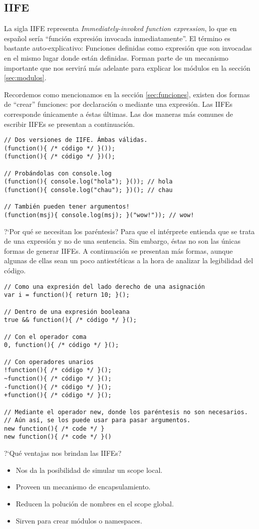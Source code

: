 
\subsection{IIFE}
\label{sec:iife}

La sigla IIFE representa \textit{Immediately-invoked function expression}, lo que en español sería "`función expresión invocada inmediatamente"'. El término es bastante auto-explicativo: Funciones definidas como expresión que son invocadas en el mismo lugar donde están definidas. Forman parte de un mecanismo importante que nos servirá más adelante para explicar los módulos en la sección \ref{sec:modulos}.

Recordemos como mencionamos en la sección \ref{sec:funciones}, existen dos formas de "`crear"' funciones: por declaración o mediante una expresión. Las IIFEs corresponde únicamente a éstas últimas. Las dos maneras más comunes de escribir IIFEs se presentan a continuación.

\begin{lstlisting}[title={Introduciendo las IIFEs}]
// Dos versiones de IIFE. Ámbas válidas.
(function(){ /* código */ }()); 
(function(){ /* código */ })(); 

// Probándolas con console.log
(function(){ console.log("hola"); }()); // hola
(function(){ console.log("chau"); })(); // chau

// También pueden tener argumentos!
(function(msj){ console.log(msj); }("wow!")); // wow!
\end{lstlisting}

?`Por qué se necesitan los paréntesis? Para que el intérprete entienda que se trata de una expresión y no de una sentencia. Sin embargo, éstas no son las únicas formas de generar IIFEs. A continuación se presentan más formas, aunque algunas de ellas sean un poco antiestéticas a la hora de analizar la legibilidad del código.

\begin{lstlisting}[title={Otras formas de escribir IIFEs}]
// Como una expresión del lado derecho de una asignación
var i = function(){ return 10; }();

// Dentro de una expresión booleana
true && function(){ /* código */ }();

// Con el operador coma
0, function(){ /* código */ }();

// Con operadores unarios
!function(){ /* código */ }();
~function(){ /* código */ }();
-function(){ /* código */ }();
+function(){ /* código */ }();

// Mediante el operador new, donde los paréntesis no son necesarios.
// Aún así, se los puede usar para pasar argumentos.
new function(){ /* code */ }
new function(){ /* code */ }()
\end{lstlisting}

?`Qué ventajas nos brindan las IIFEs?

\begin{itemize}
	\item Nos da la posibilidad de simular un scope local.
	\item Proveen un mecanismo de encapsulamiento.
	\item Reducen la polución de nombres en el scope global.
	\item Sirven para crear módulos o namespaces.
\end{itemize}
